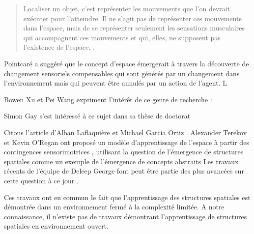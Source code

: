 \begin{quote}
	\og Localiser un objet, c'est représenter les mouvements que l'on devrait exécuter pour l'atteindre. 
	Il ne s’agit pas de représenter ces mouvements dans l’espace, mais de se représenter seulement les sensations musculaires qui accompagnent ces mouvements et qui, elles, ne supposent pas l’existence de l’espace. \fg \cite[p.~67]{pointcare_science_1902}.
\end{quote}

Pointcaré a suggéré que le concept d'espace émergerait à travers la découverte de changement sensoriels compensables qui sont générés par un changement dans l'environnement mais qui peuvent être annulés par un action de l'agent. L

Bowen Xu et Pei Wang \cite{xu_essence_2025} expriment l'intérêt de ce genre de recherche : 
\begin{quote}
	 \cite[p.~2]{xu_essence_2025}
\end{quote}

Simon Gay s'est intéressé à ce sujet dans sa thèse de doctorat \cite{gay_autonomous_2017} 

Citons l'article d'Alban Laflaquière et Michael Garcia Ortiz \og {} \fg \cite{laflaquiere_unsupervised_2019}.
Alexander Terekov et Kevin O'Regan ont proposé un modèle d'apprentissage de l'espace à partir des contingences sensorimotrices \cite{terekhov_learning_2019},  utilisant la question de l'émergence de structures spatiales comme un exemple de l'émergence de concepts abstraits
Les travaux récents de l'équipe de Deleep George font peut être partie des plus avancées sur cette question à ce jour \cite{raju_space_2022}.

Ces travaux ont en commun le fait que l'apprentissage des structures spatiales est démontrée dans un environnement fermé à la complexité limitée. 
A notre connaissance, il n'existe pas de travaux démontrant l'apprentissage de structures spatiales en environnement ouvert. 





